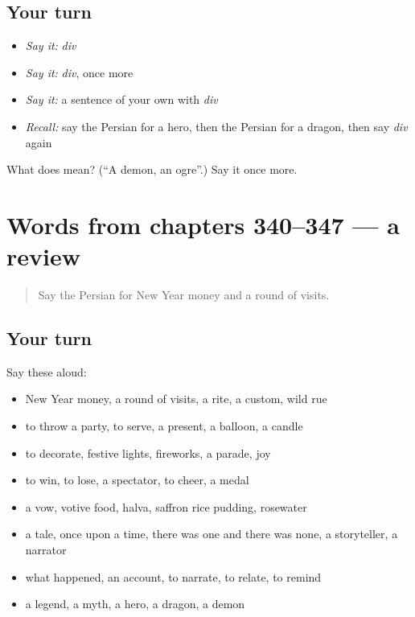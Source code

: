 \subsection*{Your turn}
\begin{itemize}
\raggedright
  \item \emph{Say it:} \emph{div}
  \item \emph{Say it:} \emph{div}, once more
  \item \emph{Say it:} a sentence of your own with \emph{div}
  \item \emph{Recall:} say the Persian for a hero, then the Persian for a dragon, then say \emph{div} again
\end{itemize}

\begin{tcolorbox}[breakable,colback=teal!4,colframe=teal!35!black,title={Before you move on}]
What does  mean? (\textquotedblleft{}A demon, an ogre\textquotedblright{}.) Say it once more.
\end{tcolorbox}
\section[(dialogue)]{Words from chapters 340–347 — a review}

\label{lesson:FA-R347-review-340-347}



\begin{quote}
Say the Persian for New Year money and a round of visits.
\end{quote}

\subsection*{Your turn}
Say these aloud:

\begin{itemize}
\raggedright
  \item New Year money, a round of visits, a rite, a custom, wild rue
  \item to throw a party, to serve, a present, a balloon, a candle
  \item to decorate, festive lights, fireworks, a parade, joy
  \item to win, to lose, a spectator, to cheer, a medal
  \item a vow, votive food, halva, saffron rice pudding, rosewater
  \item a tale, once upon a time, there was one and there was none, a storyteller, a narrator
  \item what happened, an account, to narrate, to relate, to remind
  \item a legend, a myth, a hero, a dragon, a demon
\end{itemize}

